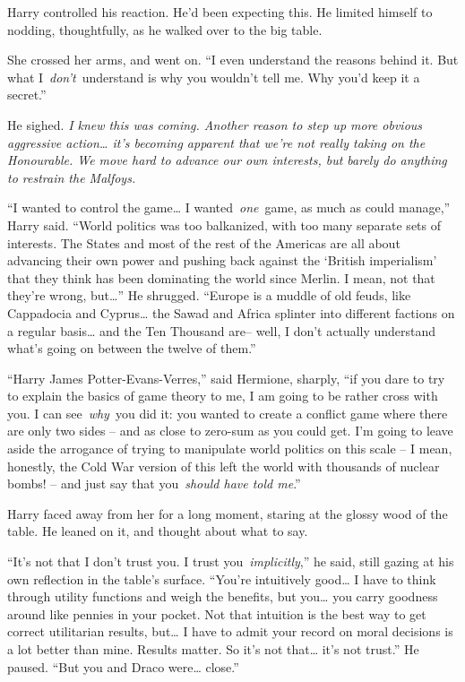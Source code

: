 Harry controlled his reaction. He'd been expecting this. He limited
himself to nodding, thoughtfully, as he walked over to the big table.

She crossed her arms, and went on. ``I even understand the reasons
behind it. But what I~\emph{don't}~understand is why you wouldn't tell
me. Why you'd keep it a secret.''

He sighed. \emph{I knew this was coming. Another reason to step up more
obvious aggressive action\ldots{} it's becoming apparent that we're not
really taking on the Honourable. We move hard to advance our own
interests, but barely do anything to restrain the Malfoys.}

``I wanted to control the game\ldots{} I wanted~\emph{one}~game, as much
as could manage,'' Harry said. ``World politics was too balkanized, with
too many separate sets of interests. The States and most of the rest of
the Americas are all about advancing their own power and pushing back
against the `British imperialism' that they think has been dominating
the world since Merlin. I mean, not that they're wrong, but\ldots{}'' He
shrugged. ``Europe is a muddle of old feuds, like Cappadocia and
Cyprus\ldots{} the Sawad and Africa splinter into different factions on
a regular basis\ldots{} and the Ten Thousand are-- well, I don't
actually understand what's going on between the twelve of them.''

``Harry James Potter-Evans-Verres,'' said Hermione, sharply, ``if you
dare to try to explain the basics of game theory to me, I am going to be
rather cross with you. I can see~\emph{why}~you did it: you wanted to
create a conflict game where there are only two sides -- and as close to
zero-sum as you could get. I'm going to leave aside the arrogance of
trying to manipulate world politics on this scale -- I mean, honestly,
the Cold War version of this left the world with thousands of nuclear
bombs! -- and just say that you~\emph{should have told me}.''

Harry faced away from her for a long moment, staring at the glossy wood
of the table. He leaned on it, and thought about what to say.

``It's not that I don't trust you. I trust you~\emph{implicitly},'' he
said, still gazing at his own reflection in the table's surface.
``You're intuitively good\ldots{} I have to think through utility
functions and weigh the benefits, but you\ldots{} you carry goodness
around like pennies in your pocket. Not that intuition is the best way
to get correct utilitarian results, but\ldots{} I have to admit your
record on moral decisions is a lot better than mine. Results matter. So
it's not that\ldots{} it's not trust.'' He paused. ``But you and Draco
were\ldots{} close.''

